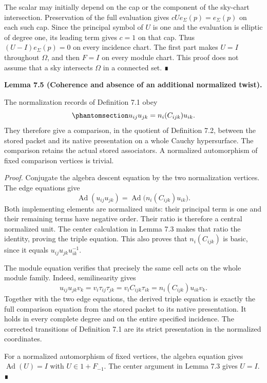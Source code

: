 \documentclass[
  english,
  11pt,
  reqno]{amsart}
\makeatletter
\newcommand{\pandocstatementheading}[1]{%
  \par\addpenalty{\@beginparpenalty}%
  \addvspace{.5\baselineskip plus .2\baselineskip minus .2\baselineskip}%
  {\normalfont\bfseries #1\par}%
  \nobreak\@afterindenttrue\@afterheading
}
\makeatother
\begin{document}
The scalar may initially depend on the cap or the component of the
sky-chart intersection. Preservation of the full evaluation gives
\(cUe_\Sigma(p)=e_\Sigma(p)\) on each such cap. Since the principal
symbol of \(U\) is one and the evaluation is elliptic of degree one, its
leading term gives \(c=1\) on that cap. Thus \((U-I)e_\Sigma(p)=0\) on
every incidence chart. The first part makes \(U=I\) throughout
\(\Omega\), and then \(F=I\) on every module chart. This proof does not
assume that a sky intersects \(\Omega\) in a connected set. ∎

\pandocstatementheading{\protect{}\label{lem:global-normalization-coherence}Lemma 7.5 (Coherence and absence of an additional normalized twist).}

The normalization records of Definition 7.1 obey
\begin{equation}\protect\phantomsection\label{eq:global-normalization-triple-identity}{
u_{ij}u_{jk}=n_i(C_{ijk})u_{ik}.
}\end{equation} They therefore give a comparison, in the quotient of
Definition 7.2, between the stored packet and its native presentation on
a whole Cauchy hypersurface. The comparison retains the actual stored
associators. A normalized automorphism of fixed comparison vertices is
trivial.

\emph{Proof.} Conjugate the algebra descent equation by the two
normalization vertices. The edge equations give \[
\operatorname{Ad}(u_{ij}u_{jk})
=\operatorname{Ad}\bigl(n_i(C_{ijk})u_{ik}\bigr).
\] Both implementing elements are normalized units: their principal term
is one and their remaining terms have negative order. Their ratio is
therefore a central normalized unit. The center calculation in Lemma 7.3
makes that ratio the identity, proving the triple equation. This also
proves that \(n_i(C_{ijk})\) is basic, since it equals
\(u_{ij}u_{jk}u_{ik}^{-1}\).

The module equation verifies that precisely the same cell acts on the
whole module family. Indeed, semilinearity gives \[
u_{ij}u_{jk}v_k
 =v_i\tau_{ij}\tau_{jk}
 =v_i C_{ijk}\tau_{ik}
 =n_i(C_{ijk})u_{ik}v_k.
\] Together with the two edge equations, the derived triple equation is
exactly the full comparison equation from the stored packet to its
native presentation. It holds in every complete degree and on the entire
specified incidence. The corrected transitions of Definition 7.1 are its
strict presentation in the normalized coordinates.

For a normalized automorphism of fixed vertices, the algebra equation
gives \(\operatorname{Ad}(U)=I\) with \(U\in1+F_{-1}\). The center
argument in Lemma 7.3 gives \(U=I\). ∎
\end{document}
